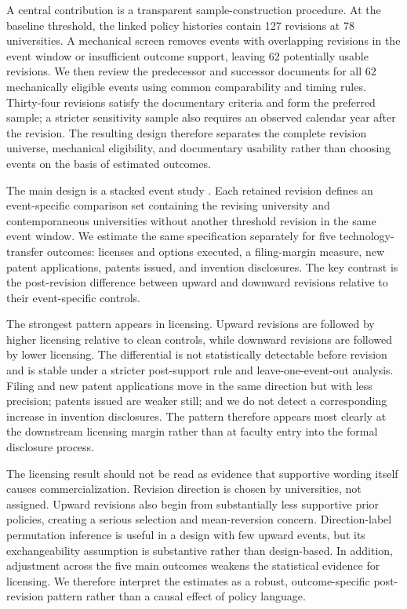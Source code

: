 A central contribution is a transparent sample-construction procedure. At the baseline threshold, the linked policy histories contain 127 revisions at 78 universities. A mechanical screen removes events with overlapping revisions in the event window or insufficient outcome support, leaving 62 potentially usable revisions. We then review the predecessor and successor documents for all 62 mechanically eligible events using common comparability and timing rules. Thirty-four revisions satisfy the documentary criteria and form the preferred sample; a stricter sensitivity sample also requires an observed calendar year after the revision. The resulting design therefore separates the complete revision universe, mechanical eligibility, and documentary usability rather than choosing events on the basis of estimated outcomes.

The main design is a stacked event study \citep{CengizEtAl2019,BakerLarckerWang2022}. Each retained revision defines an event-specific comparison set containing the revising university and contemporaneous universities without another threshold revision in the same event window. We estimate the same specification separately for five technology-transfer outcomes: licenses and options executed, a filing-margin measure, new patent applications, patents issued, and invention disclosures. The key contrast is the post-revision difference between upward and downward revisions relative to their event-specific controls.

The strongest pattern appears in licensing. Upward revisions are followed by higher licensing relative to clean controls, while downward revisions are followed by lower licensing. The differential is not statistically detectable before revision and is stable under a stricter post-support rule and leave-one-event-out analysis. Filing and new patent applications move in the same direction but with less precision; patents issued are weaker still; and we do not detect a corresponding increase in invention disclosures. The pattern therefore appears most clearly at the downstream licensing margin rather than at faculty entry into the formal disclosure process.

The licensing result should not be read as evidence that supportive wording itself causes commercialization. Revision direction is chosen by universities, not assigned. Upward revisions also begin from substantially less supportive prior policies, creating a serious selection and mean-reversion concern. Direction-label permutation inference is useful in a design with few upward events, but its exchangeability assumption is substantive rather than design-based. In addition, adjustment across the five main outcomes weakens the statistical evidence for licensing. We therefore interpret the estimates as a robust, outcome-specific post-revision pattern rather than a causal effect of policy language.

